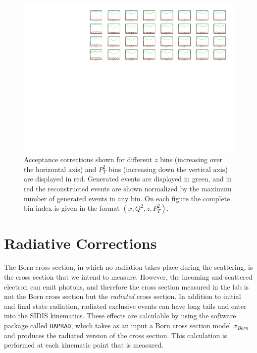 \begin{figure}
  \centering
  \label{fig:acceptance}
  \includegraphics[width=\textwidth]{image/plots/sidis/acceptance.pdf}
  \caption[Acceptance corrections for SIDIS]{Acceptance corrections shown for different $z$ bins (increasing over the horizontal axis) and $P_{T}^{2}$ bins (increasing down the vertical axis) are displayed in red.  Generated events are displayed in green, and in red the reconstructed events are shown normalized by the maximum number of generated events in any bin.  On each figure the complete bin index is given in the format $(x, Q^2, z, P_{T}^{2})$.}
\end{figure}

\section{Radiative Corrections}

The Born cross section, in which no radiation takes place during the scattering, is the cross section that we intend to measure.  However, the incoming and scattered electron can emit photons, and therefore the cross section measured in the lab is not the Born cross section but the \textit{radiated} cross section.  In addition to initial and final state radiation, radiated exclusive events can have long tails and enter into the SIDIS kinematics.  These effects are calculable by using the software package called \texttt{HAPRAD}, which takes as an input a Born cross section model $\sigma_{Born}$ and produces the radiated version of the cross section. This calculation is performed at each kinematic point that is measured.  \\

